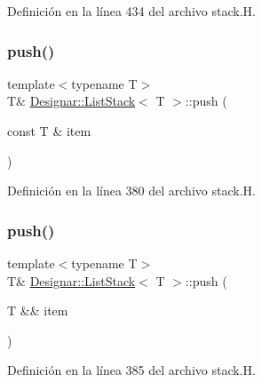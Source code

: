 Definición en la línea 434 del archivo stack.\+H.

\mbox{\label{class_designar_1_1_list_stack_a02d19090b599fd54ebb5e693d0a8d2d0}} 
\subsubsection{\texorpdfstring{push()}{push()}\hspace{0.1cm}{\footnotesize\ttfamily [1/2]}}
{\footnotesize\ttfamily template$<$typename T$>$ \\
T\& \hyperlink{class_designar_1_1_list_stack}{Designar\+::\+List\+Stack}$<$ T $>$\+::push (\begin{DoxyParamCaption}\item[{const T \&}]{item }\end{DoxyParamCaption})\hspace{0.3cm}{\ttfamily [inline]}}



Definición en la línea 380 del archivo stack.\+H.

\mbox{\label{class_designar_1_1_list_stack_a96bb73a3658f95565769e8b50c903f88}} 
\subsubsection{\texorpdfstring{push()}{push()}\hspace{0.1cm}{\footnotesize\ttfamily [2/2]}}
{\footnotesize\ttfamily template$<$typename T$>$ \\
T\& \hyperlink{class_designar_1_1_list_stack}{Designar\+::\+List\+Stack}$<$ T $>$\+::push (\begin{DoxyParamCaption}\item[{T \&\&}]{item }\end{DoxyParamCaption})\hspace{0.3cm}{\ttfamily [inline]}}



Definición en la línea 385 del archivo stack.\+H.

\mbox{\label{class_designar_1_1_list_stack_abec63f99f62a9b7d92e1a051767017dc}} 

